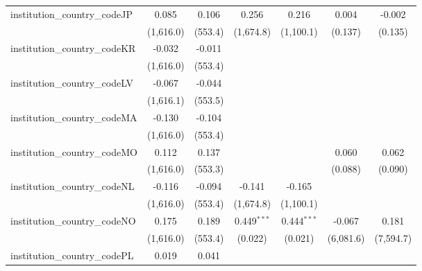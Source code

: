 \begin{tabular}{lcccccc}
   institution\_country\_codeJP          & 0.085          & 0.106          & 0.256         & 0.216         & 0.004        & -0.002\\   
                                         & (1,616.0)      & (553.4)        & (1,674.8)     & (1,100.1)     & (0.137)      & (0.135)\\   
   institution\_country\_codeKR          & -0.032         & -0.011         &               &               &              &   \\   
                                         & (1,616.0)      & (553.4)        &               &               &              &   \\   
   institution\_country\_codeLV          & -0.067         & -0.044         &               &               &              &   \\   
                                         & (1,616.1)      & (553.5)        &               &               &              &   \\   
   institution\_country\_codeMA          & -0.130         & -0.104         &               &               &              &   \\   
                                         & (1,616.0)      & (553.4)        &               &               &              &   \\   
   institution\_country\_codeMO          & 0.112          & 0.137          &               &               & 0.060        & 0.062\\   
                                         & (1,616.0)      & (553.3)        &               &               & (0.088)      & (0.090)\\   
   institution\_country\_codeNL          & -0.116         & -0.094         & -0.141        & -0.165        &              &   \\   
                                         & (1,616.0)      & (553.4)        & (1,674.8)     & (1,100.1)     &              &   \\   
   institution\_country\_codeNO          & 0.175          & 0.189          & 0.449$^{***}$ & 0.444$^{***}$ & -0.067       & 0.181\\   
                                         & (1,616.0)      & (553.4)        & (0.022)       & (0.021)       & (6,081.6)    & (7,594.7)\\   
   institution\_country\_codePL          & 0.019          & 0.041          &               &               &              &   \\   

\end{tabular}
